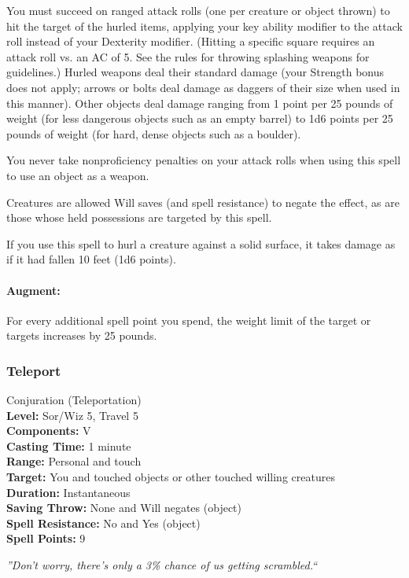 You must succeed on ranged attack rolls (one per creature or object thrown) to hit the target of the hurled items, 
applying your key ability modifier to the attack roll instead of your Dexterity modifier.
(Hitting a specific square requires an attack roll vs. an AC of 5. See the rules for throwing splashing weapons for guidelines.)
Hurled weapons deal their standard damage (your Strength bonus does not apply; 
arrows or bolts deal damage as daggers of their size when used in this manner). 
Other objects deal damage ranging from 1 point per 25 pounds of weight (for less dangerous objects such as an empty barrel) 
to 1d6 points per 25 pounds of weight (for hard, dense objects such as a boulder).

You never take nonproficiency penalties on your attack rolls when using this spell to use an object as a weapon.

Creatures are allowed Will saves (and spell resistance) to negate the effect, 
as are those whose held possessions are targeted by this spell.

If you use this spell to hurl a creature against a solid surface, 
it takes damage as if it had fallen 10 feet (1d6 points).

\paragraph{Augment:}
For every additional spell point you spend, the weight limit of the target or targets increases by 25 pounds.
\subsubsection{Teleport}
\label{Spell:Teleport}
Conjuration (Teleportation)
\\ \textbf{Level:} Sor/Wiz 5, Travel 5
\\ \textbf{Components:} V
\\ \textbf{Casting Time:} 1 minute
\\ \textbf{Range:} Personal and touch
\\ \textbf{Target:} You and touched objects or other touched willing creatures
\\ \textbf{Duration:} Instantaneous
\\ \textbf{Saving Throw:} None and Will negates (object)
\\ \textbf{Spell Resistance:} No and Yes (object)
\\ \textbf{Spell Points:} 9

\emph{''Don't worry, there's only a 3\% chance of us getting scrambled.``}

